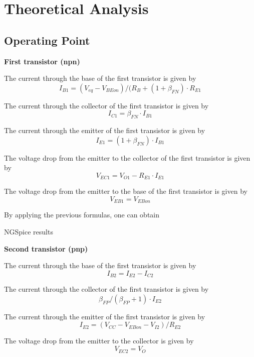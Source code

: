 \section{Theoretical Analysis}
\label{sec:theoretical analysis}

\subsection{Operating Point}

\indent

\textbf{First transistor (npn)} 

\indent

The current through the base of the first transistor is given by $$I_{B1}=(V_{eq}-V_{BEon})/(R_B+(1+\beta_{FN})\cdot R_{E1}$$

The current through the collector of the first transistor is given by $$I_{C1}=\beta _{FN}\cdot I_{B1}$$

The current through the emitter of the first transistor is given by $$I_{E1}=(1+\beta _{FN})\cdot I_{B1}$$

The voltage drop from the emitter to the collector of the first transistor is given by $$ V_{EC1}=V_{O1}-R_{E1}\cdot I_{E1} $$

The voltage drop from the emitter to the base of the first transistor is given by $$ V_{EB1} = V_{EBon} $$

By applying the previous formulas, one can obtain


NGSpice results

\vspace{1cm}

\textbf{Second transistor (pnp)}

\indent



The current through the base of the first transistor is given by $$I_{B2} = I_{E2}-I_{C2}$$

The current through the collector of the first transistor is given by $$\beta_{FP}/(\beta_{FP}+1)\cdot I_{E2}$$

The current through the emitter of the first transistor is given by $$I_{E2} = (V_{CC}-V_{EBon}-V_{I2})/R_{E2}$$

The voltage drop from the emitter to the collector is given by $$ V_{EC2} = V_{O} $$

